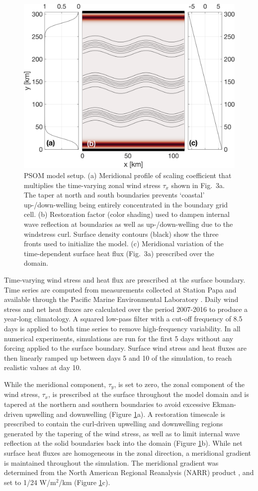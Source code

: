 \documentclass[article,linenumbers]{agujournal2019}
\begin{document}
	\begin{figure}[ht]
		\centering
		\includegraphics[width = .6\linewidth]{Fig1}
		\caption{PSOM model setup. (a) Meridional profile of scaling coefficient that multiplies the time-varying zonal wind stress $\tau_x$ shown in Fig.~3a. The taper at north and south boundaries prevents `coastal' up-/down-welling being entirely concentrated in the boundary grid cell. (b) Restoration factor (color shading) used to dampen internal wave reflection at boundaries as well as up-/down-welling due to the windstress curl. Surface density contours (black) show the three fronts used to initialize the model. (c) Meridional variation of the time-dependent surface  heat flux (Fig.~3a) prescribed over the domain.}
		\label{fig: model_domain}
	\end{figure}

	Time-varying wind stress and heat flux are prescribed at the surface boundary. Time series are computed from measurements collected at Station Papa and available through the Pacific Marine Environmental Laboratory \cite{PMEL_data}. Daily wind stress and net heat fluxes are calculated over the period 2007-2016 to produce a year-long climatology. A squared low-pass filter with a cut-off frequency of 8.5 days is applied to both time series to remove high-frequency variability. In all numerical experiments, simulations are
	run for the first 5 days without any forcing applied to the surface boundary. Surface wind stress and heat fluxes are then linearly ramped up between days 5 and 10 of the simulation, to reach realistic values at day 10.

	While the meridional component, $\tau_y$, is set to zero, the zonal component of the wind stress, $\tau_x$, is prescribed at the surface throughout the model domain and is tapered at the northern and southern boundaries to avoid excessive Ekman-driven upwelling and downwelling (Figure \ref{fig: model_domain}a). A restoration timescale is prescribed to contain the curl-driven upwelling and downwelling regions generated by the tapering of the wind stress, as well as to limit internal wave reflection at the solid boundaries back into the domain (Figure \ref{fig: model_domain}b). While net surface heat fluxes are homogeneous in the zonal direction, a meridional gradient is maintained throughout the simulation. The meridional gradient was determined from the North American Regional Reanalysis (NARR) product \cite{Mesinger_2006}, and set to 1/24 W/m$^2$/km (Figure \ref{fig: model_domain}c).
\end{document}
